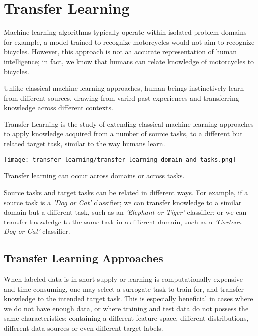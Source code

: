 \chapter[Transfer Learning]{Transfer Learning}
\label{ch:transfer-learning}

Machine learning algorithms typically operate within isolated problem domains - for example, a model trained to recognize motorcycles would not aim to recognize bicycles. However, this approach is not an accurate representation of human intelligence; in fact, we know that humans can relate knowledge of motorcycles to bicycles. \citep{aytar2011}

Unlike classical machine learning approaches, human beings instinctively learn from different sources, drawing from varied past experiences and transferring knowledge across different contexts. 

Transfer Learning is the study of extending classical machine learning approaches to apply knowledge acquired from a number of source tasks, to a different but related target task, similar to the way humans learn. \citep{thrunpratt1998}

\begin{marginfigure}
  \texttt{[image: transfer\_learning/transfer-learning-domain-and-tasks.png]}
  \caption{Transfer learning can occur across domains or across tasks.}
  \label{fig:transferlearning_domaintask}
\end{marginfigure}



Source tasks and target tasks can be related in different ways. For example, if a source task is a \textit{'Dog or Cat'} classifier; we can transfer knowledge to a similar domain but a different task, such as an \textit{'Elephant or Tiger'} classifier; or we can transfer knowledge to the same task in a different domain, such as a \textit{'Cartoon Dog or Cat'} classifier. \citep{torrey2009}


\section{Transfer Learning Approaches}\label{sec:transfer-learning-approaches}

When labeled data is in short supply or learning is computationally expensive and time consuming, one may select a surrogate task to train for, and transfer knowledge to the intended target task.  This is especially beneficial in cases where we do not have enough data, or where training and test data do not possess the same characteristics; containing a different feature space, different distributions, different data sources or even different target labels. 


